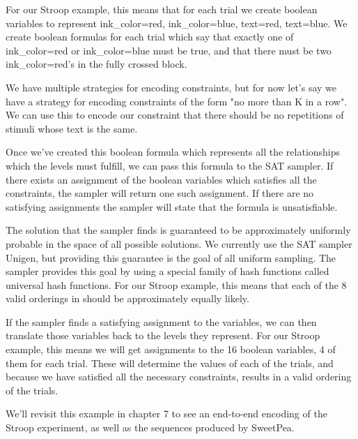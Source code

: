 For our Stroop example, this means that for each trial we create boolean variables to represent ink\_color=red, ink\_color=blue, text=red, text=blue. We create boolean formulas for each trial which say that exactly one of ink\_color=red or ink\_color=blue must be true, and that there must be two ink\_color=red's in the fully crossed block.

We have multiple strategies for encoding constraints, but for now let's say we have a strategy for encoding constraints of the form "no more than K in a row". We can use this to encode our constraint that there should be no repetitions of stimuli whose text is the same.

Once we've created this boolean formula which represents all the relationships which the levels must fulfill, we can pass this formula to the SAT sampler. If there exists an assignment of the boolean variables which satisfies all the constraints, the sampler will return one such assignment. If there are no satisfying assignments the sampler will state that the formula is unsatisfiable.

The solution that the sampler finds is guaranteed to be approximately uniformly probable in the space of all possible solutions. We currently use the SAT sampler Unigen, but providing this guarantee is the goal of all uniform sampling. The sampler provides this goal by using a special family of hash functions called universal hash functions. For our Stroop example, this means that each of the 8 valid orderings in  should be approximately equally likely.

If the sampler finds a satisfying assignment to the variables, we can then translate those variables back to the levels they represent. For our Stroop example, this means we will get assignments to the 16 boolean variables, 4 of them for each trial. These will determine the values of each of the trials, and because we have satisfied all the necessary constraints, results in a valid ordering of the trials.

We'll revisit this example in chapter 7 to see an end-to-end encoding of the Stroop experiment, as well as the sequences produced by SweetPea.
